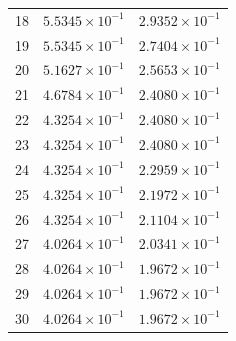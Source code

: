 \begin{table}[H]
\begin{tabular}{@{}rrr@{}}
18 & $5.5345\times10^{-1}$ & $2.9352\times10^{-1}$\\
19 & $5.5345\times10^{-1}$ & $2.7404\times10^{-1}$\\
20 & $5.1627\times10^{-1}$ & $2.5653\times10^{-1}$\\
21 & $4.6784\times10^{-1}$ & $2.4080\times10^{-1}$\\
22 & $4.3254\times10^{-1}$ & $2.4080\times10^{-1}$\\
23 & $4.3254\times10^{-1}$ & $2.4080\times10^{-1}$\\
24 & $4.3254\times10^{-1}$ & $2.2959\times10^{-1}$\\
25 & $4.3254\times10^{-1}$ & $2.1972\times10^{-1}$\\
26 & $4.3254\times10^{-1}$ & $2.1104\times10^{-1}$\\
27 & $4.0264\times10^{-1}$ & $2.0341\times10^{-1}$\\
28 & $4.0264\times10^{-1}$ & $1.9672\times10^{-1}$\\
29 & $4.0264\times10^{-1}$ & $1.9672\times10^{-1}$\\
30 & $4.0264\times10^{-1}$ & $1.9672\times10^{-1}$\\
\bottomrule
\end{tabular}
\end{table}

